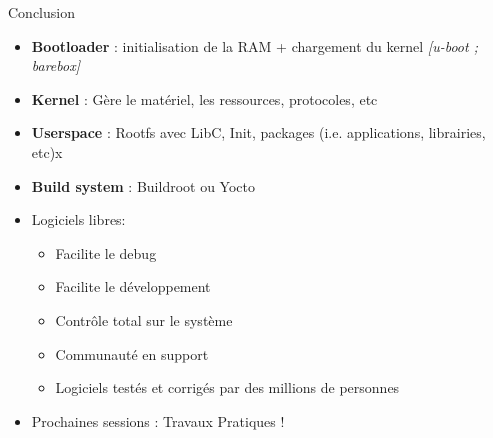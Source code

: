 \begin{frame}{Conclusion}
  \begin{itemize}
  \item \textbf{Bootloader} : initialisation de la RAM + chargement du kernel
    \textit{[u-boot ; barebox]}
  \item \textbf{Kernel} : Gère le matériel, les ressources, protocoles, etc
  \item \textbf{Userspace} : Rootfs avec LibC, Init, packages (i.e. applications, librairies, etc)x
  \item \textbf{Build system} : Buildroot ou Yocto
  \item Logiciels libres:
    \begin{itemize}
    \item Facilite le debug
    \item Facilite le développement
    \item Contrôle total sur le système
    \item Communauté en support
    \item Logiciels testés et corrigés par des millions de personnes
    \end{itemize}
    \center
  \item Prochaines sessions : Travaux Pratiques !
  \end{itemize}
\end{frame}
